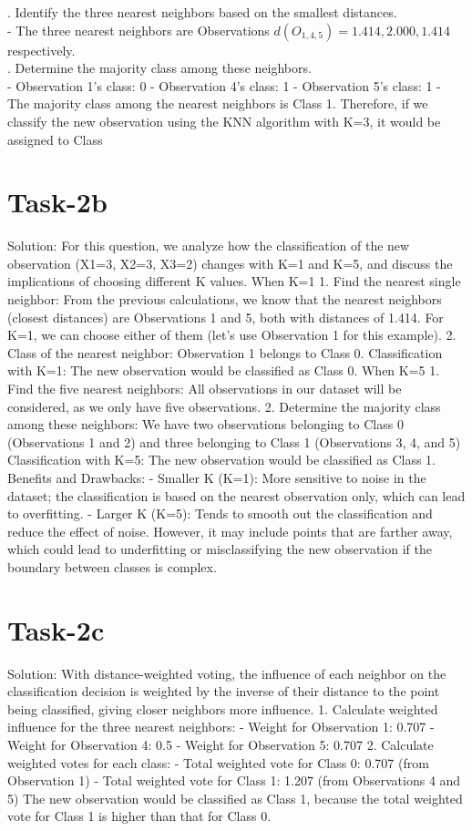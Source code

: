\documentclass{article}
\begin{document}
. Identify the three nearest neighbors based on the smallest distances.\\
- The three nearest neighbors are Observations $d(O_{1, 4, 5}) = 1.414, 2.000, 1.414$
respectively.\\

. Determine the majority class among these neighbors.\\
- Observation 1’s class: 0
- Observation 4’s class: 1
- Observation 5’s class: 1
- The majority class among the nearest neighbors is Class 1.
Therefore, if we classify the new observation using the KNN algorithm with K=3, it would be assigned to Class\\

\section{Task-2b}

Solution:
For this question, we analyze how the classification of the new observation (X1=3, X2=3, X3=2)
changes with K=1 and K=5, and discuss the implications of choosing different K values.
When K=1
1. Find the nearest single neighbor: From the previous calculations, we know that the nearest neighbors
(closest distances) are Observations 1 and 5, both with distances of 1.414. For K=1, we can choose
either of them (let’s use Observation 1 for this example).
2. Class of the nearest neighbor: Observation 1 belongs to Class 0.
Classification with K=1: The new observation would be classified as Class 0.
When K=5
1. Find the five nearest neighbors: All observations in our dataset will be considered, as we only have
five observations.
2. Determine the majority class among these neighbors: We have two observations belonging to Class 0
(Observations 1 and 2) and three belonging to Class 1 (Observations 3, 4, and 5)
Classification with K=5: The new observation would be classified as Class 1.
Benefits and Drawbacks:
- Smaller K (K=1): More sensitive to noise in the dataset; the classification is based on the nearest
observation only, which can lead to overfitting.
- Larger K (K=5): Tends to smooth out the classification and reduce the effect of noise. However, it
may include points that are farther away, which could lead to underfitting or misclassifying the new
observation if the boundary between classes is complex.

\section{Task-2c}
Solution:
With distance-weighted voting, the influence of each neighbor on the classification decision is weighted
by the inverse of their distance to the point being classified, giving closer neighbors more influence.
1. Calculate weighted influence for the three nearest neighbors:
- Weight for Observation 1: 0.707
- Weight for Observation 4: 0.5
- Weight for Observation 5: 0.707
2. Calculate weighted votes for each class:
- Total weighted vote for Class 0: 0.707 (from Observation 1)
- Total weighted vote for Class 1: 1.207 (from Observations 4 and 5)
The new observation would be classified as Class 1, because the total weighted vote for Class 1 is
higher than that for Class 0.
\end{document}
